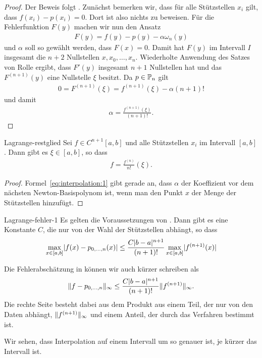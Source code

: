 \begin{proof}
  Der Beweis folgt \cite[Satz 2.1.4.1]{Stoer83}.  Zunächst bemerken
  wir, dass für alle Stützstellen $x_i$ gilt, dass
  $f(x_i) - p(x_i) = 0$. Dort ist also nichts zu beweisen.
  Für die Fehlerfunktion $F(y)$ machen wir nun den Ansatz
  \begin{gather}
    \label{eq:interpolation:1}
    F(y) = f(y)-p(y) - \alpha \omega_n(y)
  \end{gather}
  und $\alpha$ soll so gewählt werden, dass $F(x) = 0$. Damit hat $F(y)$ im
  Intervall $I$ insgesamt die $n+2$ Nullstellen $x,x_0,\dots,x_n$.
  Wiederholte Anwendung des Satzes von Rolle ergibt, dass $F'(y)$
  insgesamt $n+1$ Nullstellen hat und das $F^{(n+1)}(y)$ eine
  Nullstelle $\xi$ besitzt. Da $p\in \P_n$ gilt
  \begin{gather}
    0 = F^{(n+1)}(\xi) = f^{(n+1)}(\xi) - \alpha (n+1)!
  \end{gather}
  und damit
  \begin{gather}
    \alpha = \frac{f^{(n+1)}(\xi)}{(n+1)!}.
  \end{gather}
\end{proof}

\begin{Korollar}{Lagrange-restglied}
  Sei $f \in C^{n+1}[a,b]$ und alle Stützstellen $x_i$ im Intervall
  $[a,b]$. Dann gibt es $\xi\in[a,b]$, so dass
  \begin{gather}
    [x_0,\dots,x_n]f = \frac{f^{(n)}}{n!}(\xi).
  \end{gather}
\end{Korollar}

\begin{proof}
  Formel~\eqref{eq:interpolation:1} gibt gerade an, dass $\alpha$ der
  Koeffizient vor dem nächsten Newton-Basispolynom ist, wenn man den
  Punkt $x$ der Menge der Stützstellen hinzufügt.
\end{proof}

\begin{Korollar}{Lagrange-fehler-1}
  Es gelten die Voraussetzungen von
  . Dann gibt es eine Konstante
  $C$, die nur von der Wahl der Stützstellen abhängt, so dass
  \begin{gather}
    \max_{x\in[a,b]} \abs{f(x)-p_{0,\dots,n}(x)}
    \le \frac{C \abs{b-a}^{n+1}}{(n+1)!} \max_{x\in[a,b]} \abs{f^{(n+1)}(x)} 
  \end{gather}
\end{Korollar}

\begin{remark}
  Die Fehlerabschätzung in 
  können wir auch kürzer schreiben als
  \begin{gather}
    \norm{f-p_{0,\dots,n}}_\infty \le \frac{C \abs{b-a}^{n+1}}{(n+1)!}
    \norm{f^{(n+1)}}_{\infty}.
  \end{gather}
  Die rechte Seite besteht dabei aus dem Produkt aus einem Teil, der
  nur von den Daten abhängt, $\norm{f^{(n+1)}}_{\infty}$ und einem
  Anteil, der durch das Verfahren bestimmt ist.

  Wir sehen, dass Interpolation auf einem Intervall um so genauer ist,
  je kürzer das Intervall ist.
\end{remark}

